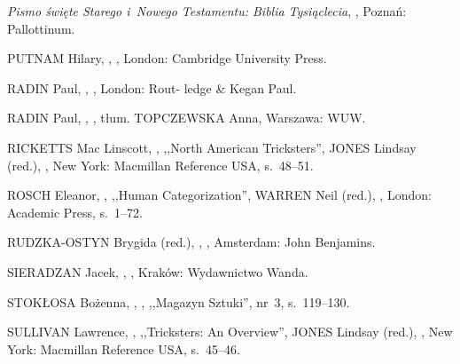 \documentclass[11pt,a4paper,twoside]{report}
\begin{document}
\begin{thebibliography}{}
{\emph{Pismo święte Starego i~Nowego Testamentu: Biblia Tysiąclecia}},
,
\newblock Poznań: Pallottinum.

{PUTNAM Hilary},
,
,
\newblock London: Cambridge University Press.

{RADIN Paul},
,
,
\newblock London: Rout- \linebreak ledge \& Kegan Paul.

{RADIN Paul},
,
,
\newblock tłum. {TOPCZEWSKA Anna},
\newblock Warszawa: WUW.

{RICKETTS Mac Linscott},
,
\newblock ,,North American Tricksters'',
\newblock {[w:]} {JONES Lindsay (red.)},
,
\newblock New York: Macmillan Reference USA,
\newblock s.~48--51.

{ROSCH Eleanor},
,
\newblock ,,Human Categorization'',
\newblock {[w:]} {WARREN Neil (red.)},
,
\newblock London: Academic Press,
\newblock s.~1--72.

{RUDZKA-OSTYN Brygida (red.)},
,
,
\newblock Amsterdam: John Benjamins.

{SIERADZAN Jacek},
,
,
\newblock Kraków: Wydawnictwo Wanda.

{STOKŁOSA Bożenna},
,
, \linebreak
\newblock {[w:]} ,,Magazyn Sztuki'',
\newblock nr~3, s.~119--130.

{SULLIVAN Lawrence},
,
\newblock ,,Tricksters: An Overview'',
\newblock {[w:]} {JONES Lindsay (red.)},
,
\newblock New York: Macmillan Reference USA,
\newblock s.~45--46.


\end{thebibliography}
\end{document}
